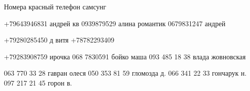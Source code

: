 



Номера красный телефон самсунг

+79643946831 андрей кв
0939879529 алина романтик
0679831247 андрей

+79280285450 д витя
+78782293409

+79283908759 ирочка
068 7830591 бойко маша
093 485 18 38 влада жовновская 

063 770 33 28 гавран олеся
050 353 81 59 гломозда д.
066 341 22 33 гончарук н.
097 217 21 45 горон в.


 
